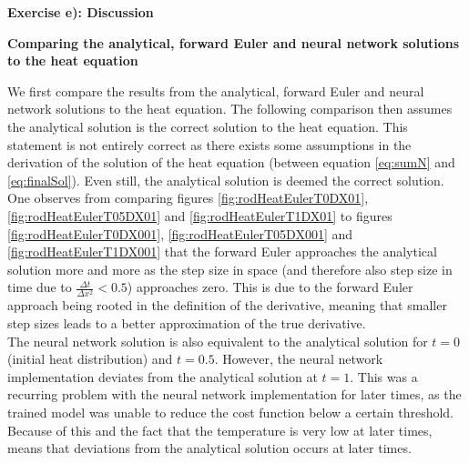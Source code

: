 \documentclass[12pt,a4paper]{article}
\begin{document}
\newpage

\begin{center}
\Large{\textbf{Exercise e): Discussion}}
\end{center}

\begin{center}
\large{\textbf{Comparing the analytical, forward Euler and neural network solutions to the heat equation}}
\end{center}

\noindent We first compare the results from the analytical, forward Euler and neural network solutions to the heat equation. The following comparison then assumes the analytical solution is the correct solution to the heat equation. This statement is not entirely correct as there exists some assumptions in the derivation of the solution of the heat equation (between equation \ref{eq:sumN} and \ref{eq:finalSol}). Even still, the analytical solution is deemed the correct solution. 
\\
One observes from comparing figures \ref{fig:rodHeatEulerT0DX01}, \ref{fig:rodHeatEulerT05DX01} and \ref{fig:rodHeatEulerT1DX01} to figures \ref{fig:rodHeatEulerT0DX001}, \ref{fig:rodHeatEulerT05DX001} and \ref{fig:rodHeatEulerT1DX001} that the forward Euler approaches the analytical solution more and more as the step size in space (and therefore also step size in time due to $\frac{\Delta t}{\Delta x^2} < 0.5$) approaches zero. This is due to the forward Euler approach being rooted in the definition of the derivative, meaning that smaller step sizes leads to a better approximation of the true derivative.
\\
The neural network solution is also equivalent to the analytical solution for $t = 0$ (initial heat distribution) and $t = 0.5$. However, the neural network implementation deviates from the analytical solution at $t = 1$. This was a recurring problem with the neural network implementation for later times, as the trained model was unable to reduce the cost function below a certain threshold. Because of this and the fact that the temperature is very low at later times, means that deviations from the analytical solution occurs at later times.
\\
\end{document}
